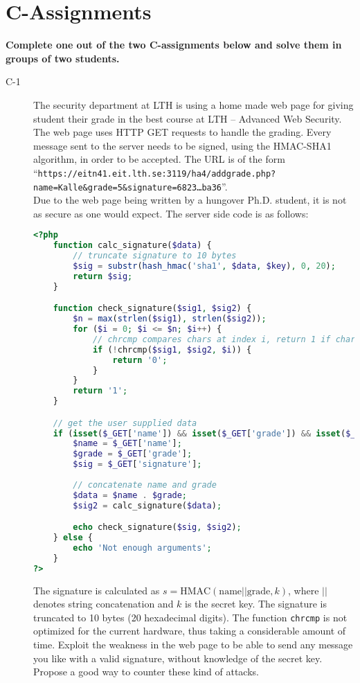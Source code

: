 \documentclass{article}
\begin{document}
\clearpage

\section*{C-Assignments}
\textbf{Complete one out of the two C-assignments below and solve them in groups of two students.}

\begin{description}
	\item[C-1]{The security department at LTH is using a home made web page for giving student their grade in the best course
	at LTH -- Advanced Web Security. The web page uses HTTP GET requests to handle the grading. Every message sent to the server
	needs to be signed, using the HMAC-SHA1 algorithm, in order to be accepted. The URL is of the form\\
	``\texttt{https://eitn41.eit.lth.se:3119/ha4/addgrade.php?name=Kalle\&grade=5\&signature=6823\ldots ba36}''.\\
	Due to the web page being written by a hungover Ph.D. student, it is not as secure as one would expect.
	The server side code is as follows:
	\begin{lstlisting}[float=htb, style=customc, language=php] 
<?php
	function calc_signature($data) {
		// truncate signature to 10 bytes
		$sig = substr(hash_hmac('sha1', $data, $key), 0, 20);
		return $sig;
	}

	function check_signature($sig1, $sig2) {
		$n = max(strlen($sig1), strlen($sig2));
		for ($i = 0; $i <= $n; $i++) {
			// chrcmp compares chars at index i, return 1 if chars are equal, 0 otherwise
			if (!chrcmp($sig1, $sig2, $i)) {
				return '0';
			}
		}
		return '1';
	}

	// get the user supplied data
	if (isset($_GET['name']) && isset($_GET['grade']) && isset($_GET['signature'])) {
		$name = $_GET['name'];
		$grade = $_GET['grade'];
		$sig = $_GET['signature'];
	
		// concatenate name and grade
		$data = $name . $grade;
		$sig2 = calc_signature($data);

		echo check_signature($sig, $sig2);
	} else {
		echo 'Not enough arguments';
	}
?>
	\end{lstlisting}
	
	The signature is calculated as $s = \textrm{HMAC}(\textrm{name}||\textrm{grade}, k)$, where $||$ denotes 
	string concatenation and $k$ is the secret key. The signature is truncated to 10 bytes (20 hexadecimal digits).
	The function \texttt{chrcmp} is not optimized for the current hardware, 
	thus taking a considerable amount of time.
	Exploit the weakness in the web page to be able to send any message you like with a valid signature, 
	without knowledge of the secret key. Propose a good way to counter these kind of attacks.
    
}
\end{description}
\end{document}
